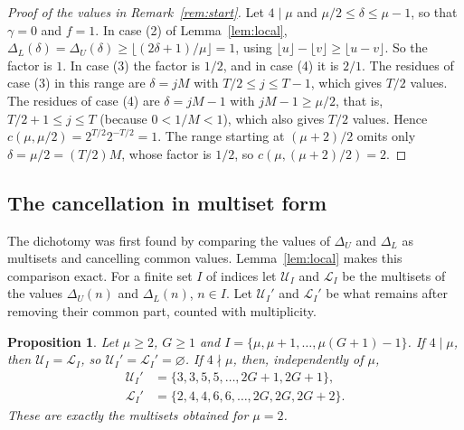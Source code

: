\documentclass{amsart}
\newtheorem{proposition}[lemma]{Proposition}
\theoremstyle{definition}
\theoremstyle{remark}
\newcommand{\DL}{\Delta_L}
\newcommand{\DU}{\Delta_U}
\begin{document}
\begin{proof}[Proof of the values in Remark~\ref{rem:start}]
Let $4\mid\mu$ and $\mu/2\le\delta\le\mu-1$, so that $\gamma=0$ and $f=1$. In case (2) of Lemma~\ref{lem:local}, $\DL(\delta)=\DU(\delta)\ge\lfloor(2\delta+1)/\mu\rfloor=1$, using $\lfloor u\rfloor-\lfloor v\rfloor\ge\lfloor u-v\rfloor$. So the factor is $1$. In case (3) the factor is $1/2$, and in case (4) it is $2/1$. The residues of case (3) in this range are $\delta=jM$ with $T/2\le j\le T-1$, which gives $T/2$ values. The residues of case (4) are $\delta=jM-1$ with $jM-1\ge\mu/2$, that is, $T/2+1\le j\le T$ (because $0<1/M<1$), which also gives $T/2$ values. Hence $c(\mu,\mu/2)=2^{T/2}2^{-T/2}=1$. The range starting at $(\mu+2)/2$ omits only $\delta=\mu/2=(T/2)M$, whose factor is $1/2$, so $c(\mu,(\mu+2)/2)=2$.
\end{proof}

\subsection*{The cancellation in multiset form}
The dichotomy was first found by comparing the values of $\DU$ and $\DL$ as multisets and cancelling common values. Lemma~\ref{lem:local} makes this comparison exact. For a finite set $I$ of indices let $\mathcal U_I$ and $\mathcal L_I$ be the multisets of the values $\DU(n)$ and $\DL(n)$, $n\in I$. Let $\mathcal U_I'$ and $\mathcal L_I'$ be what remains after removing their common part, counted with multiplicity.

\begin{proposition}\label{prop:multiset}
Let $\mu\ge2$, $G\ge1$ and $I=\{\mu,\mu+1,\dots,\mu(G+1)-1\}$. If $4\mid\mu$, then $\mathcal U_I=\mathcal L_I$, so $\mathcal U_I'=\mathcal L_I'=\varnothing$. If $4\nmid\mu$, then, independently of $\mu$,
\begin{align*}
\mathcal U_I'&=\{3,3,5,5,\dots,2G+1,2G+1\},\\
\mathcal L_I'&=\{2,4,4,6,6,\dots,2G,2G,2G+2\}.
\end{align*}
These are exactly the multisets obtained for $\mu=2$.
\end{proposition}
\end{document}
